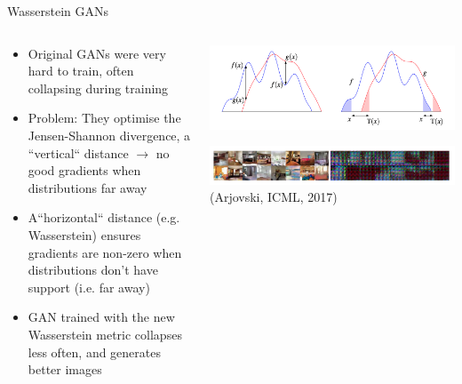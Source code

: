 \documentclass[8pt,xcolor=table,aspectratio=169]{beamer}
\begin{document}
\begin{frame}{Wasserstein GANs}


\begin{columns}
\begin{column}{0.5\textwidth}

\begin{itemize}
\item Original GANs were very hard to train, often collapsing during training

\vspace{2em} 

\item Problem: They optimise the Jensen-Shannon divergence, a ``vertical`` distance $\to$ no good gradients when distributions far away
 
\vspace{2em} 
 
\item A``horizontal`` distance (e.g. Wasserstein) ensures gradients are non-zero when distributions don't have support (i.e. far away)
 
 \vspace{2em} 
 
 \item GAN trained with the new Wasserstein metric collapses less often, and generates better images
 

\end{itemize}

\end{column}
\begin{column}{0.5\textwidth}
\centering
\includegraphics[width=\textwidth]{wasserstein}

\includegraphics[width=\textwidth]{nMnEATk.png}
(Arjovski, ICML, 2017)

\end{column}
\end{columns}
  

\end{frame}
\end{document}
